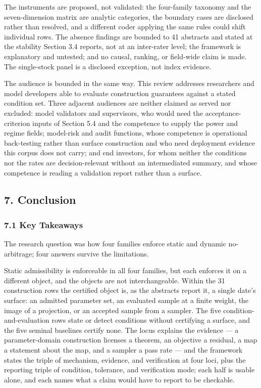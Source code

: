 \documentclass[11pt]{article}
\begin{document}
The instruments are proposed, not validated: the four-family taxonomy and the seven-dimension matrix are analytic categories, the boundary cases are disclosed rather than resolved, and a different coder applying the same rules could shift individual rows. The absence findings are bounded to 41 abstracts and stated at the stability Section 3.4 reports, not at an inter-rater level; the framework is explanatory and untested; and no causal, ranking, or field-wide claim is made. The single-stock panel is a disclosed exception, not index evidence.

The audience is bounded in the same way. This review addresses researchers and model developers able to evaluate construction guarantees against a stated condition set. Three adjacent audiences are neither claimed as served nor excluded: model validators and supervisors, who would need the acceptance-criterion inputs of Section 5.4 and the competence to supply the power and regime fields; model-risk and audit functions, whose competence is operational back-testing rather than surface construction and who need deployment evidence this corpus does not carry; and end investors, for whom neither the conditions nor the rates are decision-relevant without an intermediated summary, and whose competence is reading a validation report rather than a surface.

\subsection*{7. Conclusion}
\subsubsection*{7.1 Key Takeaways}
The research question was how four families enforce static and dynamic no-arbitrage; four answers survive the limitations.

Static admissibility is enforceable in all four families, but each enforces it on a different object, and the objects are not interchangeable. Within the 31 construction rows the certified object is, as the abstracts report it, a single date's surface: an admitted parameter set, an evaluated sample at a finite weight, the image of a projection, or an accepted sample from a sampler. The five condition-and-evaluation rows state or detect conditions without certifying a surface, and the five seminal baselines certify none. The locus explains the evidence — a parameter-domain construction licenses a theorem, an objective a residual, a map a statement about the map, and a sampler a pass rate — and the framework states the triple of mechanism, evidence, and verification at four loci, plus the reporting triple of condition, tolerance, and verification mode; each half is usable alone, and each names what a claim would have to report to be checkable.
\end{document}
